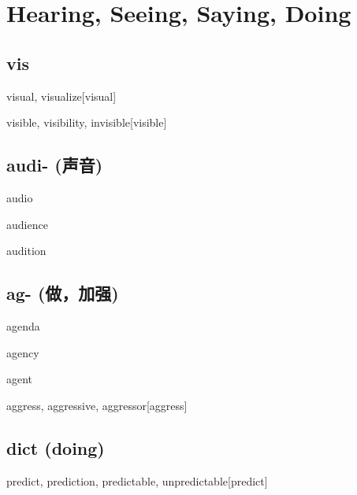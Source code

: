 \chapter{Hearing, Seeing, Saying, Doing}

\section{vis}
\begin{wordRef}{visual, visualize}[visual]
\end{wordRef}

\begin{wordRef}{visible, visibility, invisible}[visible]
\end{wordRef}

\section{audi- (声音)}
\begin{wordRef}{audio}
\end{wordRef}

\begin{wordRef}{audience}
\end{wordRef}

\begin{wordRef}{audition}
\end{wordRef}

\section{{ag- (做，加强)}}

\begin{wordRef}{agenda}
\end{wordRef}

\begin{wordRef}{agency}
\end{wordRef}

\begin{wordRef}{agent}
\end{wordRef}

\begin{wordRef}{aggress, aggressive, aggressor}[aggress]
\end{wordRef}

\section{dict (doing)}

\begin{wordRef}{predict, prediction, predictable, unpredictable}[predict]
\end{wordRef}


